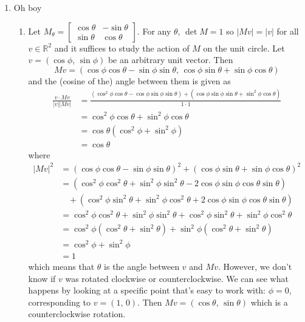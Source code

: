 \documentclass[]{article}
\newcommand{\abs}[1]{\left\vert #1 \right\vert}
\newcommand{\bbr}{\mathbb{R}}
\begin{document}
\begin{enumerate}
\item Oh boy
\begin{enumerate}
\item Let $M_\theta = \begin{bmatrix}\cos\theta & -\sin\theta \\ \sin\theta & \cos\theta\end{bmatrix}$. For any $\theta$, $\det M = 1$ so $\abs{Mv} = \abs{v}$ for all $v \in \bbr^2$ and it suffices to study the action of $M$ on the unit circle. Let $v = (\cos\phi,\, \sin\phi)$ be an arbitrary unit vector. Then 
\begin{equation}
Mv = (\cos\phi\cos\theta-\sin\phi\sin\theta,\, \cos\phi\sin\theta+\sin\phi\cos\theta)
\end{equation}
and the (cosine of the) angle between them is given as
\begin{align}
\frac{v \cdot Mv}{\abs{v}\abs{Mv}} &= \frac{\left( \cos^2\phi\cos\theta-\cos\phi\sin\phi\sin\theta \right) + \left( \cos\phi\sin\phi\sin\theta+\sin^2\phi\cos\theta \right)}{1\cdot 1} \\
&= \cos^2\phi\cos\theta + \sin^2\phi\cos\theta \\
&= \cos\theta\left(\cos^2\phi + \sin^2\phi\right) \\
&= \cos\theta
\end{align}
where
\begin{align}
\abs{Mv}^2 &= \left( \cos\phi\cos\theta-\sin\phi\sin\theta \right)^2 + \left( \cos\phi\sin\theta+\sin\phi\cos\theta \right)^2 \\
&= \left( \cos^2\phi\cos^2\theta + \sin^2\phi\sin^2\theta - 2\cos\phi\sin\phi\cos\theta\sin\theta \right) \nonumber \\
&\ \ \ \ + \left( \cos^2\phi\sin^2\theta+ \sin^2\phi\cos^2\theta + 2\cos\phi\sin\phi\cos\theta\sin\theta \right) \\
&= \cos^2\phi\cos^2\theta + \sin^2\phi\sin^2\theta + \cos^2\phi\sin^2\theta+ \sin^2\phi\cos^2\theta \\
&= \cos^2\phi(\cos^2\theta + \sin^2\theta) + \sin^2\phi(\cos^2\theta + \sin^2\theta) \\
&= \cos^2\phi + \sin^2\phi \\
&= 1
\end{align}
which means that $\theta$ is the angle between $v$ and $Mv$. However, we don't know if $v$ was rotated clockwise or counterclockwise. We can see what happens by looking at a specific point that's easy to work with: $\phi = 0$, corresponding to $v = (1,\,0)$. Then $Mv = (\cos\theta,\,\sin\theta)$ which is a counterclockwise rotation.

\end{enumerate}
\end{enumerate}
\end{document}
